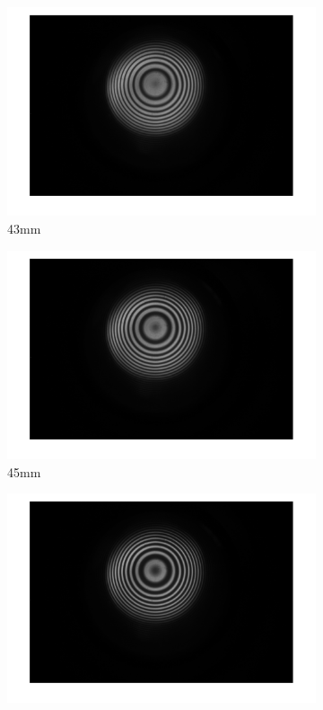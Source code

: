 \documentclass[a4paper,12pt]{article}
\begin{document}
    \begin{figure}[H]
      \centering
      
      \begin{subfigure}[b]{0.3\textwidth}
        \includegraphics[width=1.2\textwidth]{tra_ano_stripe_hor_43.png}
        \caption{43mm}
      \end{subfigure}
      \hfill
      \begin{subfigure}[b]{0.3\textwidth}
        \includegraphics[width=1.2\textwidth]{tra_ano_stripe_hor_45.png}
        \caption{45mm}
      \end{subfigure}
      \hfill
      \begin{subfigure}[b]{0.3\textwidth}
        \includegraphics[width=1.2\textwidth]{tra_ano_stripe_hor_48.png}

\end{subfigure}
\end{figure}
\end{document}
